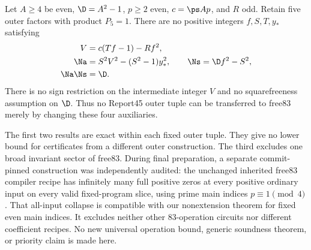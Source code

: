 \begin{theorem}
\label{thm:free}
Let $A\ge4$ be even, $\D=A^2-1$, $p\ge2$ even,
$c=\ps A p$, and $R$ odd. Retain five outer factors with product
$P_5=1$. There are no positive integers $f,S,T,y_*$ satisfying
\begin{align}
 V&=c(Tf-1)-Rf^2,\label{eq:freeV}\\
 \Na&=S^2V^2-(S^2-1)y_*^2,\qquad
 \Ns=\D f^2-S^2,\label{eq:freenorms}\\
 \Na\Ns&=\D.\label{eq:freeproduct}
\end{align}
There is no sign restriction on the intermediate integer $V$ and no
squarefreeness assumption on $\D$. Thus no Report45 outer tuple can
be transferred to free83 merely by changing these four auxiliaries.
\end{theorem}

The first two results are exact within each fixed outer tuple. They
give no lower bound for certificates from a different outer construction.
The third excludes one broad invariant sector of free83.
During final preparation, a separate commit-pinned construction was
independently audited: the unchanged inherited free83 compiler recipe
has infinitely many full positive zeros at every positive ordinary
input on every valid fixed-program slice, using prime main indices
$p\equiv1\pmod4$ \cite{primecollapse}. That all-input collapse is
compatible with our nonextension theorem for fixed even main indices.
It excludes neither other 83-operation circuits nor different
coefficient recipes. No new universal operation bound, generic
soundness theorem, or priority claim is made here.

